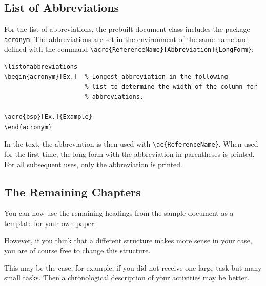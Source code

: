 \documentclass[pdftex,a4paper]{scrartcl}
\begin{document}



\subsection{List of Abbreviations}
For the list of abbreviations, the prebuilt document class includes the package
\verb+acronym+. The abbreviations are set in the environment of the same name
and defined with the command \verb+\acro{ReferenceName}[Abbreviation]{LongForm}+:

\begin{verbatim}
\listofabbreviations
\begin{acronym}[Ex.]  % Longest abbreviation in the following
                      % list to determine the width of the column for
                      % abbreviations.

\acro{bsp}[Ex.]{Example}
\end{acronym}
\end{verbatim}

In the text, the abbreviation is then used with \verb+\ac{ReferenceName}+.
When used for the first time, the long form with the abbreviation in parentheses is
printed. For all subsequent uses, only the abbreviation is printed.


\subsection{The Remaining Chapters}

You can now use the remaining headings from the sample document as a template for your own paper.

However, if you think that a different structure makes more sense in your case, you are of course free to change this structure.

This may be the case, for example, if you did not receive one large task but many small tasks. Then a chronological description of your activities may be better.
\end{document}
